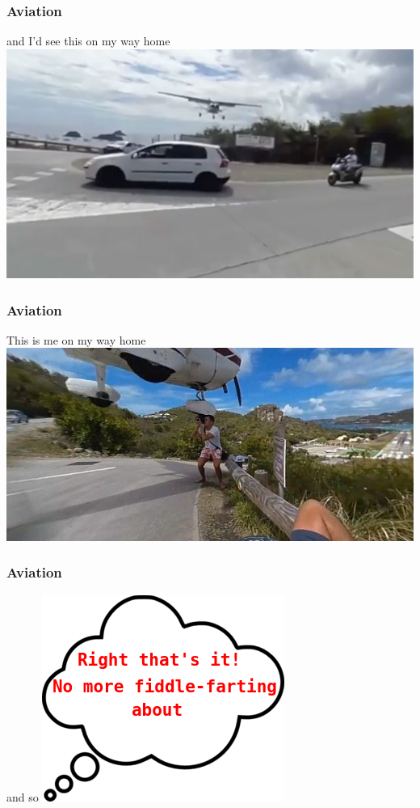 \begin{frame}
\frametitle{Aviation}
\begin{block}{and I'd see this on my way home}
\includegraphics[height=0.5\textheight]{image/aeroplane-approach.jpg}
\end{block}
\end{frame}

\begin{frame}
\frametitle{Aviation}
\begin{block}{This is me on my way home}
\includegraphics[height=0.5\textheight]{image/aeroplane-graze-photographer.jpg}
\end{block}
\end{frame}

\begin{frame}
\frametitle{Aviation}
\begin{block}{and so}
\includegraphics[height=0.5\textheight]{image/thought-bubble-thats-it.png}
\end{block}
\end{frame}

